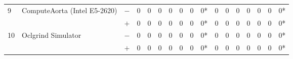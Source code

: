 \begin{tabular}{lll | rrrrrrr | rrrrrrr }
\hline
\multirow{ 2}{*}{9} & \multirow{ 2}{*}{ComputeAorta (Intel E5-2620)} & $-$ & 0 & 0 & 0 & 0 & 0 & 0 & 0*       & 0 & 0 & 0 & 0 & 0 & 0 & 0* \\& & $+$ & 0 & 0 & 0 & 0 & 0 & 0 & 0* & 0 & 0 & 0 & 0 & 0 & 0 & 0* \\
\hline
\multirow{ 2}{*}{10} & \multirow{ 2}{*}{Oclgrind Simulator} & $-$ & 0 & 0 & 0 & 0 & 0 & 0 & 0*       & 0 & 0 & 0 & 0 & 0 & 0 & 0* \\& & $+$ & 0 & 0 & 0 & 0 & 0 & 0 & 0* & 0 & 0 & 0 & 0 & 0 & 0 & 0* \\
  \bottomrule
\end{tabular}

